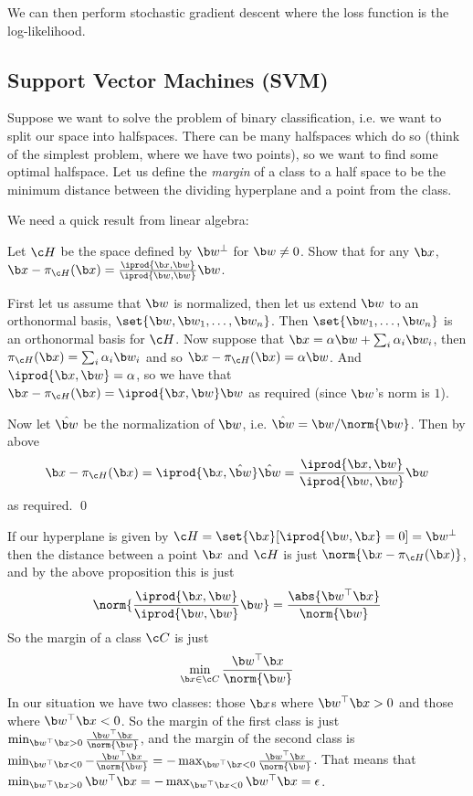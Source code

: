 \edefn

\noindent We can then perform stochastic gradient descent where the loss function is the log-likelihood.

\subsection{Support Vector Machines (SVM)}

Suppose we want to solve the problem of binary classification, i.e. we want to split our space into halfspaces.
There can be many halfspaces which do so (think of the simplest problem, where we have two points), so we want to find some optimal halfspace.
Let us define the {\it margin} of a class to a half space to be the minimum distance between the dividing hyperplane and a point from the class.

We need a quick result from linear algebra:

\bprop

    Let $\c H$ be the space defined by $\b w^\perp$ for $\b w\neq0$.
    Show that for any $\b x$, $\b x-\pi_{\c H}(\b x)=\frac{\iprod{\b x,\b w}}{\iprod{\b w,\b w}}\b w$.

\eprop

\Proof First let us assume that $\b w$ is normalized, then let us extend $\b w$ to an orthonormal basis, $\set{\b w,\b w_1,\dots,\b w_n}$.
Then $\set{\b w_1,\dots,\b w_n}$ is an orthonormal basis for $\c H$.
Now suppose that $\b x=\alpha\b w+\sum_i\alpha_i\b w_i$, then $\pi_{\c H}(\b x)=\sum_i\alpha_i\b w_i$ and so $\b x-\pi_{\c H}(\b x)=\alpha\b w$.
And $\iprod{\b x,\b w}=\alpha$, so we have that $\b x-\pi_{\c H}(\b x)=\iprod{\b x,\b w}\b w$ as required (since $\b w$'s norm is $1$).

Now let $\hat{\b w}$ be the normalization of $\b w$, i.e. $\hat{\b w}=\b w/\norm{\b w}$.
Then by above
$$ \b x - \pi_{\c H}(\b x) = \iprod{\b x,\hat{\b w}}\hat{\b w} = \frac{\iprod{\b x,\b w}}{\iprod{\b w,\b w}}\b w $$
as required.
\qed

If our hyperplane is given by $\c H=\set{\b x}[\iprod{\b w,\b x}=0]=\b w^\perp$ then the distance between a point $\b x$ and $\c H$ is just $\norm{\b x-\pi_{\c H}(\b x)}$, and by the above proposition this
is just
$$ \norm{\frac{\iprod{\b x,\b w}}{\iprod{\b w,\b w}}\b w} = \frac{\abs{\b w^\top\b x}}{\norm{\b w}} $$
So the margin of a class $\c C$ is just
$$ \min_{\b x\in\c C}\frac{\b w^\top\b x}{\norm{\b w}} $$
In our situation we have two classes: those $\b x$s where $\b w^\top\b x>0$ and those where $\b w^\top\b x<0$.
So the margin of the first class is just $\min_{\b w^\top\b x>0}\frac{\b w^\top\b x}{\norm{\b w}}$, and the margin of the second class is
$\min_{\b w^\top\b x<0}-\frac{\b w^\top\b x}{\norm{\b w}}=-\max_{\b w^\top\b x<0}\frac{\b w^\top\b x}{\norm{\b w}}$.
That means that $\min_{\b w^\top\b x>0}\b w^\top\b x=-\max_{\b w^\top\b x<0}\b w^\top\b x=\epsilon$.

